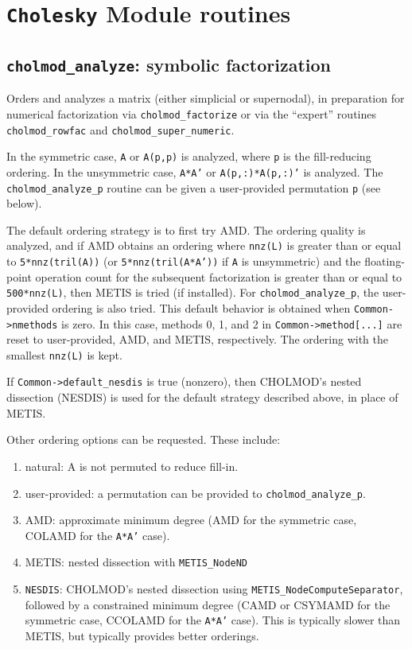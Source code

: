 \documentclass[11pt]{article}
\begin{document}
\newpage \section{{\tt Cholesky} Module routines}

\subsection{{\tt cholmod\_analyze}: symbolic factorization}


Orders and analyzes a matrix (either simplicial or supernodal), in preparation
for numerical factorization via {\tt cholmod\_factorize} or via the ``expert''
routines {\tt cholmod\_rowfac} and {\tt cholmod\_super\_numeric}.

In the symmetric case, {\tt A} or {\tt A(p,p)} is analyzed,
where {\tt p} is the fill-reducing ordering.
In the unsymmetric case, {\tt A*A'} or {\tt A(p,:)*A(p,:)'} is analyzed.
The {\tt cholmod\_analyze\_p} routine can be given a user-provided permutation {\tt p}
(see below).

The default ordering strategy is to first try AMD.
The ordering quality is analyzed, and if AMD obtains an ordering where
{\tt nnz(L)} is greater than or equal to {\tt 5*nnz(tril(A))}
(or {\tt 5*nnz(tril(A*A'))} if {\tt A} is unsymmetric) and
the floating-point operation count for the subsequent factorization is
greater than or equal to {\tt 500*nnz(L)}, then METIS is tried (if installed).
For {\tt cholmod\_analyze\_p}, the user-provided ordering is also tried.
This default behavior is obtained when {\tt Common->nmethods} is zero.
In this case, methods 0, 1, and 2 in {\tt Common->method[...]} are reset
to user-provided, AMD, and METIS, respectively.
The ordering with the smallest {\tt nnz(L)} is kept.

If {\tt Common->default\_nesdis} is true (nonzero), then CHOLMOD's
nested dissection (NESDIS) is used for the default strategy described
above, in place of METIS.

Other ordering options can be requested.  These include:
\begin{enumerate}
\item	natural:    A is not permuted to reduce fill-in.
\item	user-provided:	    a permutation can be provided to {\tt cholmod\_analyze\_p}.
\item	AMD:	    approximate minimum degree (AMD for the symmetric case, COLAMD for the {\tt A*A'} case).
\item	METIS:	    nested dissection with {\tt METIS\_NodeND}
\item	{\tt NESDIS}:	    CHOLMOD's nested dissection using
    {\tt METIS\_NodeComputeSeparator},
    followed by a constrained minimum degree
    (CAMD or CSYMAMD for the symmetric case, CCOLAMD for the {\tt A*A'} case).
    This is typically slower than METIS, but typically provides better orderings.
\end{enumerate}
\end{document}

